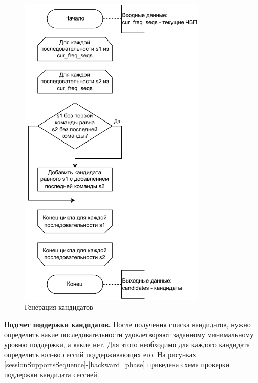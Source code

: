 \newpage
\begin{figure}[h!]
	\centering
	\includegraphics[width=0.8\textwidth]{inc/img/generateCandidates.drawio.pdf}
	\caption{Генерация кандидатов}
	\label{generateCandidates}
\end{figure}


\newpage
\textbf{Подсчет поддержки кандидатов.}
После получения списка кандидатов, нужно определить какие последовательности удовлетворяют заданному минимальному уровню поддержки, а какие нет. Для этого необходимо для каждого кандидата определить кол-во сессий поддерживающих его. На рисунках \ref{sessionSupportsSequence}-\ref{backward_phase} приведена схема проверки поддержки кандидата сессией.


